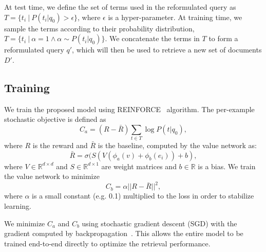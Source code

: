 \documentclass[11pt,letterpaper]{article}
\newcommand{\RR}[0]{\mathbb{R}}
\begin{document}
At test time, we define the set of terms used in the reformulated query as $T=\{t_i\ |\ P(t_i|q_0)>\epsilon\}$, where $\epsilon$ is a hyper-parameter.
At training time, we sample the terms according to their probability distribution, $T=\{t_i\ |\ \alpha=1 \wedge \alpha \sim P(t_i|q_0)\}$.
We concatenate the terms in $T$ to form a reformulated query $q'$, which will then be used to retrieve a new set of documents $D'$. 



\subsection{Training}

We train the proposed model using REINFORCE~\cite{williams1992simple} algorithm. The per-example stochastic objective is defined as
\begin{equation} \label{eq:2}
    C_a = (R - \bar{R}) \sum_{t \in T} \log P(t | q_0),
\end{equation}
where $R$ is the reward and $\bar{R}$ is the baseline,
computed by the value network as:
\begin{equation} \label{eq:3}
	\bar{R} = \sigma( S(V ( \phi_a(v) + \phi_b(e_i) ) + b),
\end{equation}
where $V \in \RR^{d \times d}$ and $S \in \RR^{d \times 1}$ are weight matrices and $b \in \RR$ is a bias.
We train the value network to minimize
\begin{equation} \label{eq:4}
	C_b = \alpha||R-\bar{R}||^2,
\end{equation}
where $\alpha$ is a small constant (e.g. 0.1) multiplied to the loss in order to stabilize learning.

We minimize $C_a$ and $C_b$ using stochastic gradient descent (SGD) with the gradient computed by backpropagation~\cite{rumelhart1988learning}. This allows the entire model to be trained end-to-end directly to optimize the retrieval performance. 

\end{document}
